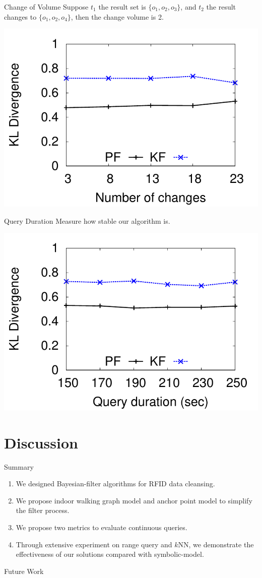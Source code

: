 \documentclass[xcolor={usenames,dvipsnames}]{beamer}
\begin{document}
\begin{frame}[label={sec:orgc7032ea}]{Change of Volume}
Suppose \(t_1\) the result set is \(\{o_1, o_2, o_3\}\), and
\(t_2\) the result changes to \(\{o_1, o_2, o_4\}\), then the
change volume is 2.

\begin{center}
\includegraphics[width=.7\textwidth]{img/cont-kl-n.pdf}
\end{center}
\end{frame}

\begin{frame}[label={sec:orga6452b5}]{Query Duration}
Measure how stable our algorithm is.

\begin{center}
\includegraphics[width=.7\textwidth]{img/cont-kl-t.pdf}
\end{center}
\end{frame}

\section{Discussion}
\label{sec:org5022c45}

\begin{frame}[label={sec:org7841d58}]{Summary}
\begin{enumerate}
\item We designed Bayesian-filter algorithms for RFID data cleansing.
\item We propose indoor walking graph model and anchor point model to
simplify the filter process.
\item We propose two metrics to evaluate continuous queries.
\item Through extensive experiment on range query and \(k\)NN, we
demonstrate the effectiveness of our solutions compared with
symbolic-model.
\end{enumerate}
\end{frame}

\begin{frame}[label={sec:orgbee18f5}]{Future Work}
\end{frame}
\end{document}

